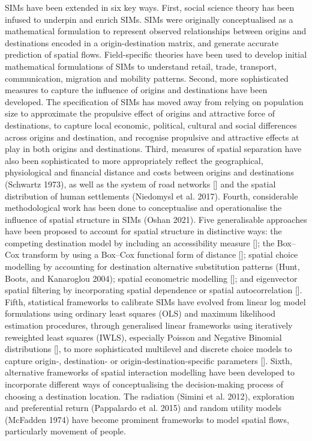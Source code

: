 \documentclass[11pt,letterpaper]{article}
\begin{document}
SIMs have been extended in six key ways.
First, social science theory has been infused to underpin and enrich SIMs.
SIMs were originally conceptualised as a mathematical formulation to represent observed relationships between origins and destinations encoded in a origin-destination matrix, and generate accurate prediction of spatial flows.
Field-specific theories have been used to develop initial mathematical formulations of SIMs to understand retail, trade, transport, communication, migration and mobility patterns.
Second, more sophisticated measures to capture the influence of origins and destinations have been developed.
The specification of SIMs has moved away from relying on population size to approximate the propulsive effect of origins and attractive force of destinations, to capture local economic, political, cultural and social differences across origins and destination, and recognise propulsive and attractive effects at play in both origins and destinations.
Third, measures of spatial separation have also been sophisticated to more appropriately reflect the geographical, physiological and financial distance and costs between origins and destinations (Schwartz 1973), as well as the system of road networks {[}{]} and the spatial distribution of human settlements (Niedomysl et al. 2017).
Fourth, considerable methodological work has been done to conceptualise and operationalise the influence of spatial structure in SIMs (Oshan 2021).
Five generalisable approaches have been proposed to account for spatial structure in distinctive ways: the competing destination model by including an accessibility measure {[}{]}; the Box--Cox transform by using a Box--Cox functional form of distance {[}{]}; spatial choice modelling by accounting for destination alternative substitution patterns (Hunt, Boots, and Kanaroglou 2004); spatial econometric modelling {[}{]}; and eigenvector spatial filtering by incorporating spatial dependence or spatial autocorrelation {[}{]}.
Fifth, statistical frameworks to calibrate SIMs have evolved from linear log model formulations using ordinary least squares (OLS) and maximum likelihood estimation procedures, through generalised linear frameworks using iteratively reweighted least squares (IWLS), especially Poisson and Negative Binomial distributions {[}{]}, to more sophisticated multilevel and discrete choice models to capture origin-, destination- or origin-destination-specific parameters {[}{]}.
Sixth, alternative frameworks of spatial interaction modelling have been developed to incorporate different ways of conceptualising the decision-making process of choosing a destination location.
The radiation (Simini et al. 2012), exploration and preferential return (Pappalardo et al. 2015) and random utility models (McFadden 1974) have become prominent frameworks to model spatial flows, particularly movement of people.
\end{document}
